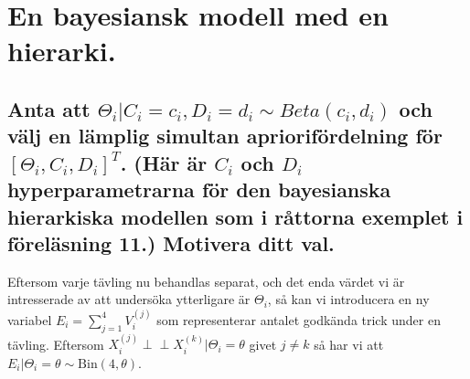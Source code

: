 \documentclass{article}
\newcommand{\independent}{\perp\!\!\!\!\perp}
\begin{document}
\newpage
\section{En bayesiansk modell med en hierarki.}

\subsection{Anta att $\Theta_i | C_i = c_i, D_i = d_i \sim Beta(c_i, d_i)$ och välj en lämplig simultan apriorifördelning för $[\Theta_i, C_i, D_i]^T$.
(Här är $C_i$ och $D_i$ hyperparametrarna för den bayesianska hierarkiska modellen som i råttorna exemplet i föreläsning 11.) Motivera ditt val.}

Eftersom varje tävling nu behandlas separat, och det enda värdet vi är intresserade av att undersöka ytterligare är $\Theta_i$,
så kan vi introducera en ny variabel $E_i = \sum\limits_{j=1}^4 V_i^{(j)}$ som representerar antalet godkända trick under en tävling.
Eftersom $X_i^{(j)} \independent X_i^{(k)} | \Theta_i = \theta$ givet $j \neq k$ så har vi att $E_i | \Theta_i = \theta \sim \text{Bin}(4, \theta)$.
\end{document}
